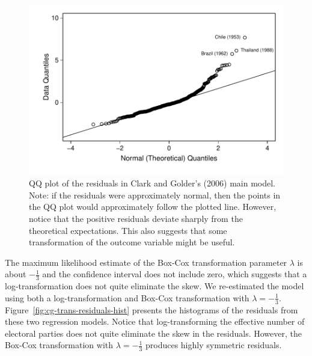 \documentclass[12pt]{article}
\begin{document}
\begin{figure}[h!]
\begin{center}
	\includegraphics[scale = 0.6]{figs/cg-qq-plot.pdf}
\caption{QQ plot of the residuals in Clark and Golder's (2006) main model.\\
Note: if the residuals were approximately normal, then the points in the QQ plot would approximately follow the plotted line. 
However, notice that the positive residuals deviate sharply from the theoretical expectations. 
This also suggests that some transformation of the outcome variable might be useful.}\label{fig:cg-qq-plot}
\end{center}

\end{figure}

The maximum likelihood estimate of the Box-Cox transformation parameter $\lambda$ is about $-\frac{1}{3}$ and the confidence interval does not include zero, which suggests that a log-transformation does not quite eliminate the skew. 
We re-estimated the model using both a log-transformation and Box-Cox transformation with $\lambda = -\frac{1}{3}$. 
Figure~\ref{fig:cg-trans-residuals-hist} presents the histograms of the residuals from these two regression models. 
Notice that log-transforming the effective number of electoral parties does not quite eliminate the skew in the residuals. However, the Box-Cox transformation with $\lambda = -\frac{1}{3}$ produces highly symmetric residuals. 
\end{document}
